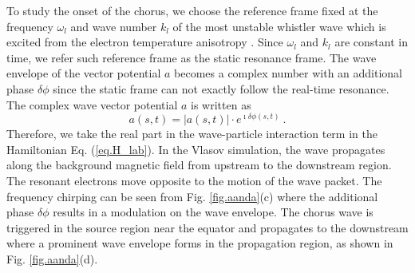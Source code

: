To study the onset of the chorus, we choose the reference frame fixed at the frequency  $\omega_l$ and wave number $k_l$  of the most unstable whistler wave which is excited from the electron temperature anisotropy \cite{gary_1993}. 
Since $\omega_l$ and $k_l$ are constant in time, we refer such reference frame as the static resonance frame. 
The  wave envelope of the vector potential $a$ becomes a complex number with an additional phase $\delta \phi$ since the static frame can not exactly follow the real-time resonance. 
The complex wave vector potential $a$ is written as 
\begin{equation}
    a(s,t) = |a(s,t)| \cdot e^{\imath \delta \phi(s,t)}~.
\end{equation}
Therefore, we take the real part in the wave-particle interaction term in the  Hamiltonian Eq. (\ref{eq.H_lab}).
In the Vlasov simulation,
 the wave propagates along the background magnetic field from upstream to the downstream region.
The resonant electrons 
move opposite to the motion of the wave packet.  
The frequency chirping can be seen from Fig. \ref{fig.aanda}(c) where the additional phase $\delta \phi$ results in a modulation on the wave envelope.
The chorus wave is triggered in the source region near the equator and propagates to the downstream where a prominent wave envelope forms in the propagation region, as shown in Fig. \ref{fig.aanda}(d).


